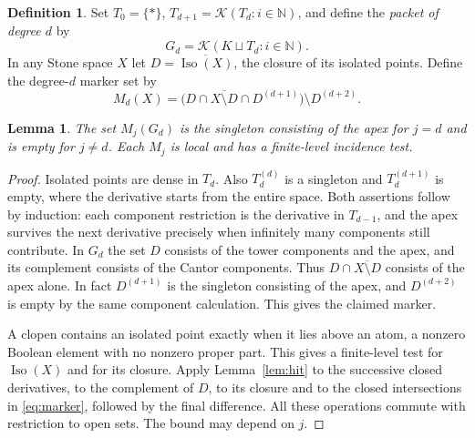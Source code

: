 \documentclass[11pt,letterpaper]{article}
\newtheorem{lemma}[theorem]{Lemma}
\theoremstyle{definition}\newtheorem{definition}[theorem]{Definition}
\newcommand{\N}{\mathbb N}
\begin{document}
\begin{definition}
Set \(T_0=\{*\}\), \(T_{d+1}=\mathcal K(T_d:i\in\N)\), and define the
\emph{packet of degree \(d\)} by
\[
 G_d=\mathcal K(K\sqcup T_d:i\in\N).
\]
In any Stone space \(X\) let \(D=\overline{\operatorname{Iso}(X)}\), the
closure of its isolated points. Define the degree-\(d\) marker set by
\begin{equation}\label{eq:marker}
 M_d(X)=\bigl(D\cap\overline{X\setminus D}\cap D^{(d+1)}\bigr)
                         \setminus D^{(d+2)}.
\end{equation}
\end{definition}

\begin{lemma}\label{lem:packets}
The set \(M_j(G_d)\) is the singleton consisting of the apex for \(j=d\)
and is empty for \(j\ne d\). Each \(M_j\) is local and has a finite-level
incidence test.
\end{lemma}
\begin{proof}
Isolated points are dense in \(T_d\). Also \(T_d^{(d)}\) is a singleton
and \(T_d^{(d+1)}\) is empty, where the derivative starts from the entire
space. Both assertions follow by induction: each component restriction is
the derivative in \(T_{d-1}\), and the apex survives the next derivative
precisely when infinitely many components still contribute. In \(G_d\)
the set \(D\) consists of the tower components and the apex, and its
complement consists of the Cantor components. Thus \(D\cap\overline{X\setminus
D}\) consists of the apex alone. In fact \(D^{(d+1)}\) is the singleton
consisting of the apex, and \(D^{(d+2)}\) is empty by the same component calculation. This gives
the claimed marker.

A clopen contains an isolated point exactly when it lies above an atom,
a nonzero Boolean element with no nonzero proper part. This gives a
finite-level test for \(\operatorname{Iso}(X)\) and for its closure.
Apply Lemma~\ref{lem:hit} to the successive closed derivatives, to the
complement of \(D\), to its closure and to the closed intersections in
\eqref{eq:marker}, followed by the final difference. All these operations
commute with restriction to open sets. The bound may depend on \(j\).
\end{proof}
\end{document}
